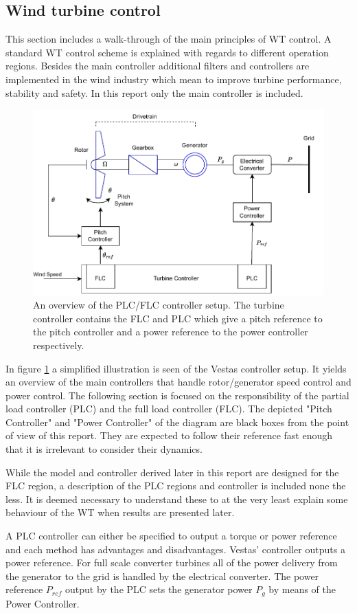 \subsection{Wind turbine control} \label{sec:theory_ctrl}
This section includes a walk-through of the main principles of WT control. A standard WT control scheme is explained with regards to different operation regions. Besides the main controller additional filters and controllers are implemented in the wind industry which mean to improve turbine performance, stability and safety. In this report only the main controller is included.
\begin{figure}[ht]
	\centering
	\includegraphics[width=0.7\linewidth]{Graphics/PLC_PI.pdf}
	\caption{An overview of the PLC/FLC controller setup. The turbine controller contains the FLC and PLC which give a pitch reference to the pitch controller and a power reference to the power controller respectively.}
	\label{fig:controller_overview}
\end{figure}
In figure \cref{fig:controller_overview} a simplified illustration is seen of the Vestas controller setup. It yields an overview of the main controllers that handle rotor/generator speed control and power control. The following section is focused on the responsibility of the partial load controller (PLC) and the full load controller (FLC). The depicted "Pitch Controller" and "Power Controller" of the diagram are black boxes from the point of view of this report. They are expected to follow their reference fast enough that it is irrelevant to consider their dynamics.

While the model and controller derived later in this report are designed for the FLC region, a description of the PLC regions and controller is included none the less. It is deemed necessary to understand these to at the very least explain some behaviour of the WT when results are presented later.

A PLC controller can either be specified to output a torque or power reference and each method has advantages and disadvantages. Vestas' controller outputs a power reference. For full scale converter turbines all of the power delivery from the generator to the grid is handled by the electrical converter. The power reference $ P_{ref} $ output by the PLC sets the generator power $ P_g $ by means of the Power Controller.


